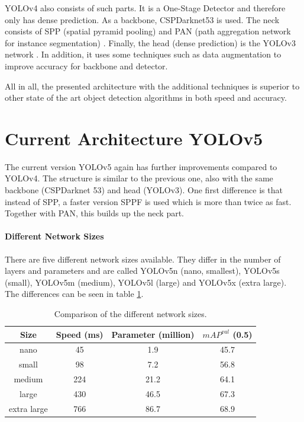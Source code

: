 YOLOv4 \cite{yolov4} also consists of such parts. It is a One-Stage Detector and therefore only has dense prediction. As a backbone, CSPDarknet53 \cite{Wang_2020_CVPR_Workshops} is used. The neck consists of SPP (spatial pyramid pooling) \cite{7005506} and PAN (path aggregation network for instance segmentation) \cite{Liu_2018_CVPR}. Finally, the head (dense prediction) is the YOLOv3 network \cite{yolov3}. In addition, it uses some techniques such as data augmentation to improve accuracy for backbone and detector. 

All in all, the presented architecture with the additional techniques is superior to other state of the art object detection algorithms in both speed and accuracy. 

\section{Current Architecture YOLOv5} 

The current version YOLOv5 \cite{yolov5} again has further improvements compared to YOLOv4. The structure is similar to the previous one, also with the same backbone (CSPDarknet 53) and head (YOLOv3). One first difference is that instead of SPP, a faster version SPPF is used which is more than twice as fast. Together with PAN, this builds up the neck part.

\paragraph{Different Network Sizes}
There are five different network sizes available. They differ in the number of layers and parameters and are called YOLOv5n (nano, smallest), YOLOv5s (small), YOLOv5m (medium), YOLOv5l (large) and YOLOv5x (extra large). The differences can be seen in table \ref{tab:network_sizes}.

\begin{table}[h!]
	\centering
	\begin{tabular}{|c c c c|} 
		\hline
		Size & Speed (ms) & Parameter (million) & $ mAP^{val} $ (0.5)\\ %
		\hline
		nano & 45 & 1.9 & 45.7 \\
		small & 98 & 7.2 & 56.8 \\
		medium & 224 & 21.2 & 64.1 \\
		large & 430 & 46.5 & 67.3 \\
		extra large & 766 & 86.7 & 68.9 \\
		\hline
	\end{tabular}
	\caption{Comparison of the different network sizes.}
	\label{tab:network_sizes}
\end{table}

